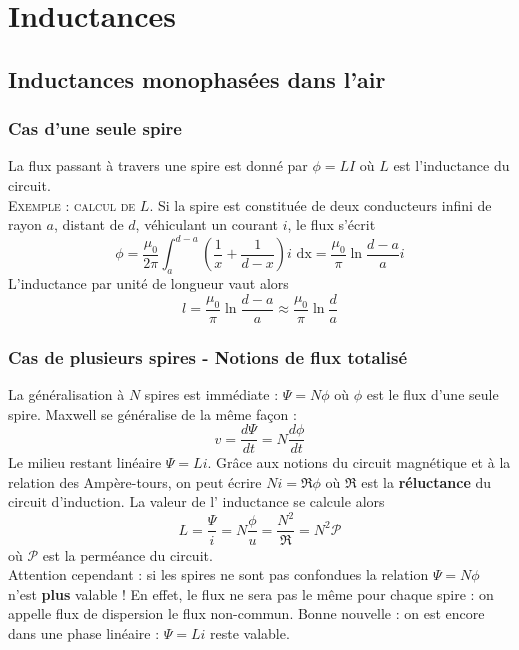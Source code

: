 \section{Inductances}
	\subsection{Inductances monophasées dans l'air}
		\subsubsection{Cas d'une seule spire}
		La flux passant à travers une spire est donné par $\phi = 
		LI$ où 		$L$ est l'inductance du circuit.\\
		\textsc{Exemple : calcul de $L$}. Si la spire est constituée 
		de deux conducteurs infini de rayon $a$, distant de $d$, 
		véhiculant un courant $i$, le flux s'écrit
		\begin{equation}
		\phi = \frac{\mu_0}{2\pi}\int_{a}^{d-a}\left(\frac{1}{x}+
		\frac{1}{d-x}\right) i \text{ dx} = \frac{\mu_0}{\pi}\ln
		\frac{d-a}{a}i
		\end{equation}
		L'inductance par unité de longueur vaut alors
		\begin{equation}
		l = \frac{\mu_0}{\pi}\ln\frac{d-a}{a}\approx\frac{\mu_0}{
		\pi}\ln\frac{d
		}{a}
		\end{equation}
		
		
		\subsubsection{Cas de plusieurs spires - Notions de flux 
		totalisé}
		La généralisation à $N$ spires est immédiate : $\Psi = 
		N\phi$ où $\phi$ est le flux d'une seule spire. Maxwell 
		se généralise de la même façon :
		\begin{equation}
		v = \frac{d\Psi}{dt} = N\frac{d\phi}{dt}
		\end{equation}
		Le milieu restant linéaire $\Psi = Li$. Grâce aux notions 
		du circuit magnétique et à la relation des Ampère-tours, on 
		peut écrire $Ni = \mathfrak{R}\phi$ où $\mathfrak{R}$ est la 
		\textbf{réluctance} du circuit d'induction. La valeur de l'
		inductance se calcule alors
		\begin{equation}
		L = \frac{\Psi}{i} = N\frac{\phi}{u} = \frac{N^2}{\mathfrak{R}} 
		= N^2 \mathcal{P}
		\end{equation}
		où $\mathcal{P}$ est la perméance du circuit. \\
		Attention cependant : si les spires ne sont pas confondues la 
		relation $\Psi = N\phi$ n'est \textbf{plus} valable ! En effet, 
		le flux ne sera pas le même pour chaque spire : on appelle 
		flux de dispersion le flux non-commun. Bonne nouvelle : on est 
		encore dans une phase linéaire : $\Psi = Li$ reste valable.
		
